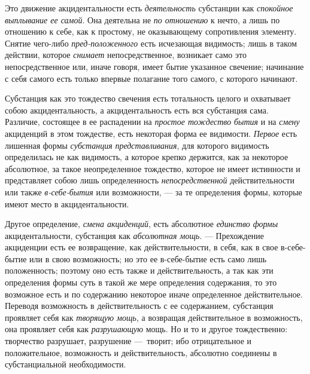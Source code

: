 Это движение акцидентальности есть {\em деятельность}
субстанции как {\em спокойное выплывание ее самой}. Она
деятельна не {\em по отношению} к нечто, а лишь по
отношению к себе, как к простому, не оказывающему сопротивления элементу.
Снятие чего-либо {\em пред-положенного} есть исчезающая
видимость; лишь в таком действии, которое {\em снимает}
непосредственное, возникает само это непосредственное или, иначе говоря,
имеет бытие указанное свечение; начинание с себя самого есть только впервые
полагание того самого, с которого начинают.

Субстанция как это тождество свечения есть тотальность целого и охватывает
собою акцидентальность, а акцидентальность есть вся субстанция сама.
Различие, состоящее в ее распадении на {\em простое
тождество} {\em бытия} и на
{\em смену} акциденций в этом тождестве, есть некоторая
форма ее видимости. {\em Первое} есть лишенная формы
{\em субстанция}
{\em представливания}, для которого видимость
определилась не как видимость, а которое крепко держится, как за некоторое
абсолютное, за такое неопределенное тождество, которое не имеет истинности
и представляет собою лишь определенность
{\em непосредственной} действительности или также
{\em в-себе-бытия} или возможности, — за те определения
формы, которые имеют место в акцидентальности.

Другое определение, {\em смена акциденций}, есть
абсолютное {\em единство формы} акцидентальности,
субстанция как {\em абсолютная мощь}. — Прехождение
акциденции есть ее возвращение, как действительности, в себя, как в свое
в-себе-бытие или в свою возможность; но это ее в-себе-бытие есть само лишь
положенность; поэтому оно есть также и действительность, а так как эти
определения формы суть в такой же мере определения содержания, то это
возможное есть и по содержанию некоторое иначе определенное действительное.
Переводя возможность в действительность с ее содержанием, субстанция
проявляет себя как {\em творящую мощь}, а возвращая
действительное в возможность, она проявляет себя как
{\em разрушающую} мощь. Но и то и другое тождественно:
творчество разрушает, разрушение —~творит; ибо отрицательное и
положительное, возможность и действительность, абсолютно соединены в
субстанциальной необходимости.

